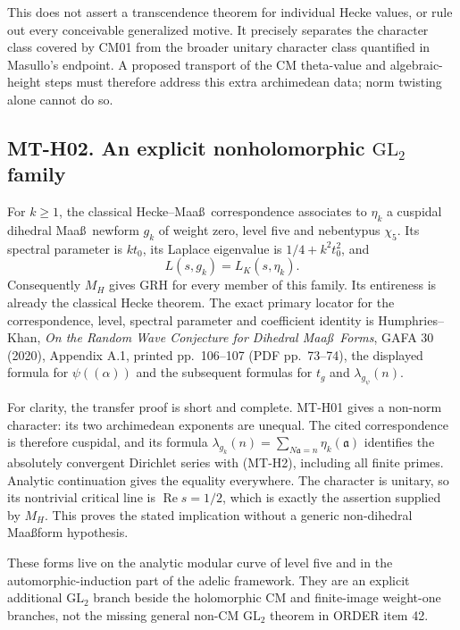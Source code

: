 This does not assert a transcendence theorem for individual Hecke
values, or rule out every conceivable generalized motive. It precisely
separates the character class covered by CM01 from the broader unitary
character class quantified in Masullo's endpoint. A proposed transport
of the CM theta-value and algebraic-height steps must therefore address
this extra archimedean data; norm twisting alone cannot do so.

\subsection*{MT-H02. An explicit nonholomorphic \texorpdfstring{$\mathrm{GL}_2$}{GL2} family}
For $k\ge1$, the classical Hecke--Maa\ss\ correspondence associates to
$\eta_k$ a cuspidal dihedral Maa\ss\ newform $g_k$ of weight zero,
level five and nebentypus $\chi_5$. Its spectral parameter is $kt_0$,
its Laplace eigenvalue is $1/4+k^2t_0^2$, and
\[
       L(s,g_k)=L_K(s,\eta_k).
                                                               \tag{MT-H2}
\]
Consequently $M_H$ gives GRH for every member of this family. Its
entireness is already the classical Hecke theorem. The exact primary
locator for the correspondence, level, spectral parameter and coefficient
identity is Humphries--Khan, \emph{On the Random Wave Conjecture for
Dihedral Maa\ss\ Forms}, GAFA 30 (2020), Appendix A.1, printed pp.~106--107 (PDF pp.~73--74), the displayed
formula for $\psi((\alpha))$ and the subsequent formulas for
$t_g$ and $\lambda_{g_\psi}(n)$.

For clarity, the transfer proof is short and complete. MT-H01 gives
a non-norm character: its two archimedean exponents are unequal.
The cited correspondence is therefore cuspidal, and its formula
$\lambda_{g_k}(n)=\sum_{N\mathfrak a=n}\eta_k(\mathfrak a)$ identifies
the absolutely convergent Dirichlet series with (MT-H2), including all
finite primes. Analytic continuation gives the equality everywhere.
The character is unitary, so its nontrivial critical line is
$\operatorname{Re}s=1/2$, which is exactly the assertion supplied by
$M_H$. This proves the stated implication without a generic
non-dihedral Maa\ss\-form hypothesis.

These forms live on the analytic modular curve of level five and in
the automorphic-induction part of the adelic framework. They are an
explicit additional $\mathrm{GL}_2$ branch beside the holomorphic
CM and finite-image weight-one branches, not the missing general
non-CM $\mathrm{GL}_2$ theorem in ORDER item 42.

